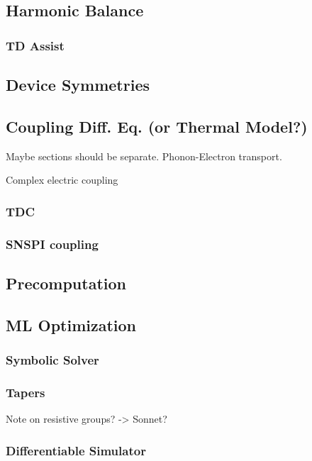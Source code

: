 \documentclass{article}
\begin{document}
\subsection{Harmonic Balance}

\subsubsection{TD Assist}

\subsection{Device Symmetries}

\subsection{Coupling Diff. Eq. (or Thermal Model?)}

Maybe sections should be separate. Phonon-Electron transport.

Complex electric coupling

\subsubsection{TDC}

\subsubsection{SNSPI coupling}

\subsection{Precomputation}

\subsection{ML Optimization}

\subsubsection{Symbolic Solver}

\subsubsection{Tapers}

Note on resistive groups? -> Sonnet?

\subsubsection{Differentiable Simulator}
\end{document}

